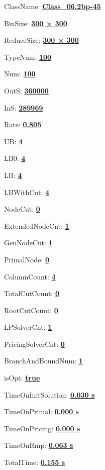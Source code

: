 \documentclass[11pt]{article}
\begin{document}
\pagestyle{empty}


ClassName: \underline{\textbf{Class_06.2bp-45}}
\par
BinSize: \underline{\textbf{300 × 300}}
\par
ReduceSize: \underline{\textbf{300 × 300}}
\par
TypeNum: \underline{\textbf{100}}
\par
Num: \underline{\textbf{100}}
\par
OutS: \underline{\textbf{360000}}
\par
InS: \underline{\textbf{289969}}
\par
Rate: \underline{\textbf{0.805}}
\par
UB: \underline{\textbf{4}}
\par
LB0: \underline{\textbf{4}}
\par
LB: \underline{\textbf{4}}
\par
LBWithCut: \underline{\textbf{4}}
\par
NodeCut: \underline{\textbf{0}}
\par
ExtendedNodeCnt: \underline{\textbf{1}}
\par
GenNodeCnt: \underline{\textbf{1}}
\par
PrimalNode: \underline{\textbf{0}}
\par
ColumnCount: \underline{\textbf{4}}
\par
TotalCutCount: \underline{\textbf{0}}
\par
RootCutCount: \underline{\textbf{0}}
\par
LPSolverCnt: \underline{\textbf{1}}
\par
PricingSolverCnt: \underline{\textbf{0}}
\par
BranchAndBoundNum: \underline{\textbf{1}}
\par
isOpt: \underline{\textbf{true}}
\par
TimeOnInitSolution: \underline{\textbf{0.030 s}}
\par
TimeOnPrimal: \underline{\textbf{0.000 s}}
\par
TimeOnPricing: \underline{\textbf{0.000 s}}
\par
TimeOnRmp: \underline{\textbf{0.063 s}}
\par
TotalTime: \underline{\textbf{0.155 s}}
\par
\newpage
\end{document}
